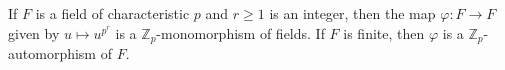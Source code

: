 If $F$ is a field of characteristic $p$ and $r \geq 1$ is an integer, then the map $\varphi : F \to F$ given by $u \mapsto u^{p^r}$ is a $\mathbb{Z}_p$-monomorphism of fields. If $F$ is finite, then $\varphi$ is a $\mathbb{Z}_p$-automorphism of $F$.
